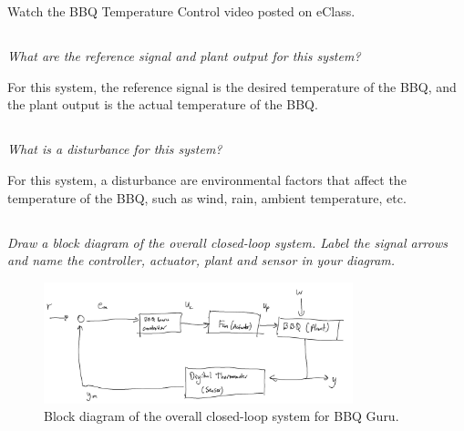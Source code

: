 \section{}
Watch the BBQ Temperature Control video posted on eClass.
\subsection{}
\textit{What are the reference signal and plant output for this system?} 

For this system, the reference signal is the desired temperature of the BBQ, and the plant output is the actual temperature of the BBQ.

\subsection{}
\textit{What is a disturbance for this system?}

For this system, a disturbance are environmental factors that affect the temperature of the BBQ, such as wind, rain, ambient temperature, etc.

\subsection{}
\textit{Draw a block diagram of the overall closed-loop system. Label the signal arrows and name
the controller, actuator, plant and sensor in your diagram.}

\begin{figure}[h]
    \centering
    \includegraphics[width=0.8\textwidth]{Questions/Figures/Q1c.png}
    \caption{Block diagram of the overall closed-loop system for BBQ Guru.}
    \label{fig:Q1c}
\end{figure}

